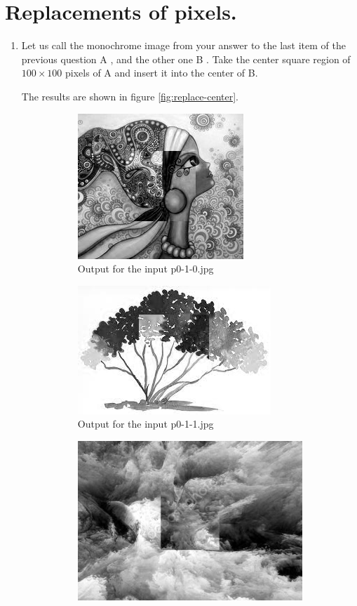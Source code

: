 \section{Replacements of pixels.}
\begin{enumerate}[label=\emph{\alph*)}]
\item Let us call the monochrome image from your answer to the last item of the previous question A , and the other one B . Take the center square region of $100 \times 100$ pixels of A and insert it into the center of B.

The results are shown in figure \ref{fig:replace-center}.
\begin{figure}[h!]
\centering
\begin{subfigure}{0.5\textwidth}
  \centering
  \includegraphics[width=0.5\linewidth]{../output/p0-3-a-0.jpg}
  \caption{Output for the input p0-1-0.jpg}
  \label{fig:sfig1}
\end{subfigure}%
\begin{subfigure}{0.5\textwidth}
  \centering
  \includegraphics[width=0.5\linewidth]{../output/p0-3-a-1.jpg}
  \caption{Output for the input p0-1-1.jpg}
  \label{fig:sfig2}
\end{subfigure}
\begin{subfigure}{0.5\textwidth}
  \centering
  \includegraphics[width=0.5\linewidth]{../output/p0-3-a-2.jpg}

\end{subfigure}
\end{figure}
\end{enumerate}
